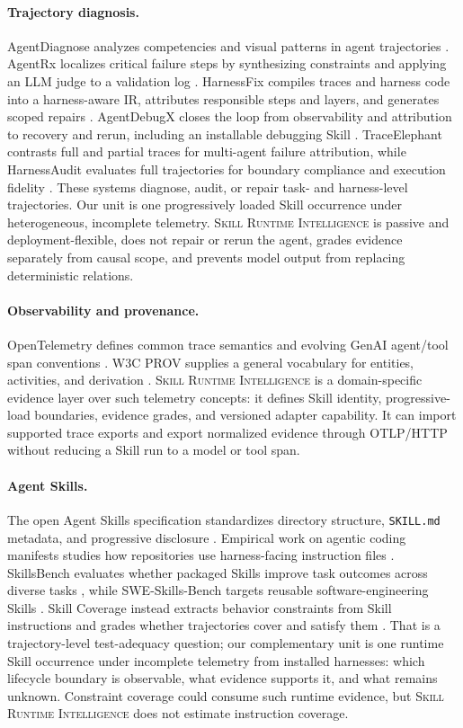 \documentclass[runningheads]{llncs}
\newcommand{\system}{\textsc{Skill Runtime Intelligence}\xspace}
\begin{document}
\paragraph{Trajectory diagnosis.}
AgentDiagnose analyzes competencies and visual patterns in agent trajectories
\cite{agentdiagnose}.  AgentRx localizes critical failure steps by synthesizing
constraints and applying an LLM judge to a validation log \cite{agentrx}.
HarnessFix compiles traces and harness code into a harness-aware IR, attributes
responsible steps and layers, and generates scoped repairs \cite{harnessfix}.
AgentDebugX closes the loop from observability and attribution to recovery and
rerun, including an installable debugging Skill \cite{agentdebugx}.
TraceElephant contrasts full and partial traces for multi-agent failure
attribution, while HarnessAudit evaluates full trajectories for boundary
compliance and execution fidelity \cite{traceelephant,harnessaudit}. These
systems diagnose, audit, or repair task- and harness-level trajectories. Our unit
is one progressively loaded Skill occurrence under heterogeneous, incomplete
telemetry. \system is passive and deployment-flexible, does not repair or rerun
the agent, grades evidence separately from causal scope, and prevents model
output from replacing deterministic relations.

\paragraph{Observability and provenance.}
OpenTelemetry defines common trace semantics and evolving GenAI agent/tool span
conventions \cite{otel-genai}.  W3C PROV supplies a general vocabulary for
entities, activities, and derivation \cite{w3c-prov-dm}.  \system is a
domain-specific evidence layer over such telemetry concepts: it defines Skill
identity, progressive-load boundaries, evidence grades, and versioned adapter
capability. It can import supported trace exports and export normalized evidence
through OTLP/HTTP without reducing a Skill run to a model or tool span.

\paragraph{Agent Skills.}
The open Agent Skills specification standardizes directory structure,
\texttt{SKILL.md} metadata, and progressive disclosure
\cite{agent-skills-spec}.  Empirical work on agentic coding manifests studies
how repositories use harness-facing instruction files \cite{coding-manifests}.
SkillsBench evaluates whether packaged Skills improve task outcomes across
diverse tasks \cite{skillsbench}, while SWE-Skills-Bench targets reusable
software-engineering Skills \cite{sweskillsbench}. Skill Coverage instead
extracts behavior constraints from
Skill instructions and grades whether trajectories cover and satisfy them
\cite{skillcoverage}. That is a trajectory-level test-adequacy question; our
complementary unit is one runtime Skill occurrence under incomplete telemetry
from installed harnesses: which lifecycle boundary is observable, what evidence
supports it, and what remains unknown. Constraint coverage could consume such
runtime evidence, but \system does not estimate instruction coverage.
\end{document}
